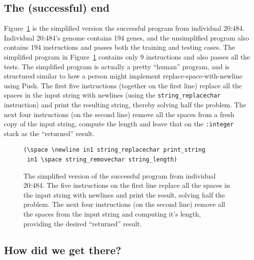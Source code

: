 \subsection{The (successful) end}

Figure~\ref{prog:simplified20:484} 
is the simplified version the successful program from 
individual 20:484. Individual 20:484's genome contains 194 genes, and the unsimplified 
program also contains 194 instructions and passes both
the training and testing cases. The simplified program in 
Figure~\ref{prog:simplified20:484} contains only 9 instructions and
also passes all the tests. 
The simplified program is actually a pretty ``human'' program, and is structured similar to 
how a person might implement replace-space-with-newline using Push. The first five 
instructions (together on the first line) replace all the spaces in the input string 
with newlines (using the \texttt{string\_replacechar} instruction) and print the 
resulting string, thereby solving half the problem. 
The next four instructions (on the second line) remove all the spaces from
a fresh copy of the input string, compute the length and leave that on the
\texttt{:integer} stack as the ``returned'' result.

\begin{figure}[h]
\begin{verbatim}
(\space \newline in1 string_replacechar print_string
 in1 \space string_removechar string_length)
\end{verbatim}
\caption{The simplified version of the successful program from individual 20:484. The
	five instructions on the first line replace all the spaces in the input string with newlines
	and print the result, solving half the problem. The next four instructions (on the second
	line) remove all the spaces from the input string and computing it's length, providing
	the desired ``returned'' result.}
\label{prog:simplified20:484}
\end{figure}

\subsection{How did we get there?}

